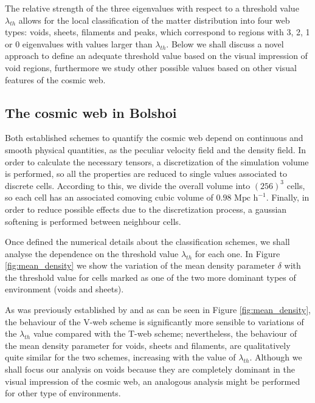 \documentclass[usenatbib]{latex/mn2e}
\begin{document}
The relative strength of the three eigenvalues with respect to a threshold
value $\lambda_{th}$ allows for the local classification of the matter 
distribution into four web types: voids, sheets, filaments and peaks, 
which correspond to regions with 3, 2, 1 or 0 eigenvalues with values 
larger than $\lambda_{th}$. Below we shall discuss a novel approach to 
define an adequate threshold value based on the visual impression of void
regions, furthermore we study other possible values based on other visual
features of the cosmic web.



\subsection{The cosmic web in Bolshoi}
\label{subsec:web_in_simulations}



Both established schemes to quantify the cosmic web depend on continuous 
and smooth physical quantities, as the peculiar velocity field and the 
density field. In order to calculate the necessary tensors, a discretization
of the simulation volume is performed, so all the properties are reduced 
to single values associated to discrete cells. According to this, we divide 
the overall volume into $(256)^3$ cells, so each cell has an associated 
comoving cubic volume of $0.98 \mbox{ Mpc h}^{-1}$. Finally, in order to 
reduce possible effects due to the discretization process, a gaussian 
softening is performed between neighbour cells.



Once defined the numerical details about the classification schemes, we 
shall analyse the dependence on the threshold value $\lambda_{th}$ for each 
one. In Figure \ref{fig:mean_density} we show the variation of the mean 
density parameter $\delta$ with the threshold value for cells marked as one 
of the two more dominant types of environment (voids and sheets).



As was previously established by  and as 
can be seen in Figure \ref{fig:mean_density}, the behaviour of the 
V-web scheme is significantly more sensible to variations of the 
$\lambda_{th}$ value compared with the T-web scheme; nevertheless, the 
behaviour of the mean density parameter for voids, sheets and filaments, 
are qualitatively quite similar for the two schemes, increasing with the 
value of $\lambda_{th}$. Although we shall focus our analysis on voids 
because they are completely dominant in the visual impression of the 
cosmic web, an analogous analysis might be performed for other type of 
environments.
\end{document}
